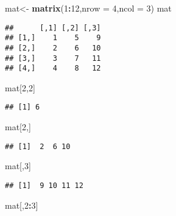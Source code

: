 \documentclass[
]{article}
\newenvironment{Shaded}{\begin{snugshade}}{\end{snugshade}}
\newcommand{\AttributeTok}[1]{\textcolor[rgb]{0.13,0.29,0.53}{#1}}
\newcommand{\DecValTok}[1]{\textcolor[rgb]{0.00,0.00,0.81}{#1}}
\newcommand{\FunctionTok}[1]{\textcolor[rgb]{0.13,0.29,0.53}{\textbf{#1}}}
\newcommand{\NormalTok}[1]{#1}
\newcommand{\OtherTok}[1]{\textcolor[rgb]{0.56,0.35,0.01}{#1}}
\newcommand{\SpecialCharTok}[1]{\textcolor[rgb]{0.81,0.36,0.00}{\textbf{#1}}}
\begin{document}
\begin{Shaded}
\begin{Highlighting}[]
\NormalTok{mat}\OtherTok{\textless{}{-}} \FunctionTok{matrix}\NormalTok{(}\DecValTok{1}\SpecialCharTok{:}\DecValTok{12}\NormalTok{,}\AttributeTok{nrow =} \DecValTok{4}\NormalTok{,}\AttributeTok{ncol =} \DecValTok{3}\NormalTok{)}
\NormalTok{mat}
\end{Highlighting}
\end{Shaded}

\begin{verbatim}
##      [,1] [,2] [,3]
## [1,]    1    5    9
## [2,]    2    6   10
## [3,]    3    7   11
## [4,]    4    8   12
\end{verbatim}

\begin{Shaded}
\begin{Highlighting}[]
\NormalTok{mat[}\DecValTok{2}\NormalTok{,}\DecValTok{2}\NormalTok{]}
\end{Highlighting}
\end{Shaded}

\begin{verbatim}
## [1] 6
\end{verbatim}

\begin{Shaded}
\begin{Highlighting}[]
\NormalTok{mat[}\DecValTok{2}\NormalTok{,]}
\end{Highlighting}
\end{Shaded}

\begin{verbatim}
## [1]  2  6 10
\end{verbatim}

\begin{Shaded}
\begin{Highlighting}[]
\NormalTok{mat[,}\DecValTok{3}\NormalTok{]}
\end{Highlighting}
\end{Shaded}

\begin{verbatim}
## [1]  9 10 11 12
\end{verbatim}

\begin{Shaded}
\begin{Highlighting}[]
\NormalTok{mat[,}\DecValTok{2}\SpecialCharTok{:}\DecValTok{3}\NormalTok{]}
\end{Highlighting}
\end{Shaded}
\end{document}
